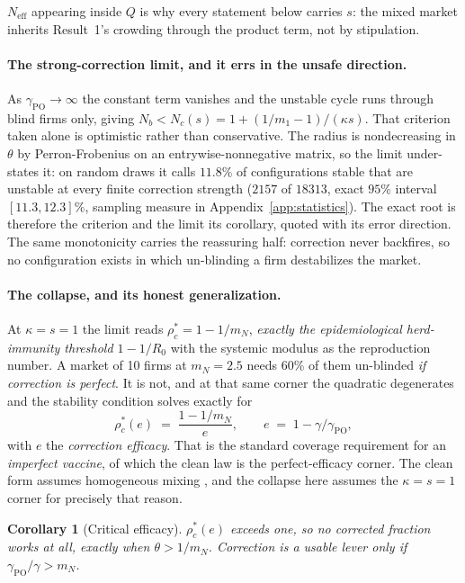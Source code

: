\documentclass{article}
\theoremstyle{plain}
\newtheorem{corollary}[theorem]{Corollary}
\theoremstyle{definition}
\newcommand{\Neff}{N_{\mathrm{eff}}}
\newcommand{\mN}{m_N}
\begin{document}
$\Neff$ appearing inside $Q$ is why every statement below carries $s$: the mixed market inherits Result~1's crowding through the product term, not by stipulation.

\paragraph{The strong-correction limit, and it errs in the unsafe direction.}
As $\gamma_{\mathrm{PO}}\to\infty$ the constant term vanishes and the unstable cycle runs through blind firms only, giving $N_b < N_c(s) = 1 + (1/m_1 - 1)/(\kappa s)$. That criterion taken alone is optimistic rather than conservative. The radius is nondecreasing in $\theta$ by Perron-Frobenius on an entrywise-nonnegative matrix, so the limit under-states it: on random draws it calls $11.8\%$ of configurations stable that are unstable at every finite correction strength ($2157$ of $18313$, exact $95\%$ interval $[11.3,12.3]\%$, sampling measure in Appendix~\ref{app:statistics}). The exact root is therefore the criterion and the limit its corollary, quoted with its error direction. The same monotonicity carries the reassuring half: correction never backfires, so no configuration exists in which un-blinding a firm destabilizes the market.

\paragraph{The collapse, and its honest generalization.}
At $\kappa = s = 1$ the limit reads $\rho_c^{*} = 1 - 1/\mN$, \emph{exactly the epidemiological herd-immunity threshold $1-1/R_0$} with the systemic modulus as the reproduction number. A market of 10 firms at $\mN = 2.5$ needs 60\% of them un-blinded \emph{if correction is perfect}. It is not, and at that same corner the quadratic degenerates and the stability condition solves exactly for
\begin{equation}
\rho_c^{*}(e) \;=\; \frac{1 - 1/\mN}{e}, \qquad e \;=\; 1 - \gamma/\gamma_{\mathrm{PO}},
\end{equation}
with $e$ the \emph{correction efficacy}. That is the standard coverage requirement for an \emph{imperfect vaccine}, of which the clean law is the perfect-efficacy corner. The clean form assumes homogeneous mixing \citep{fine2011}, and the collapse here assumes the $\kappa=s=1$ corner for precisely that reason.

\begin{corollary}[Critical efficacy]
\label{cor:efficacy}
$\rho_c^{*}(e)$ exceeds one, so no corrected fraction works at all, exactly when $\theta > 1/\mN$. Correction is a usable lever only if $\gamma_{\mathrm{PO}}/\gamma > \mN$.
\end{corollary}
\end{document}
